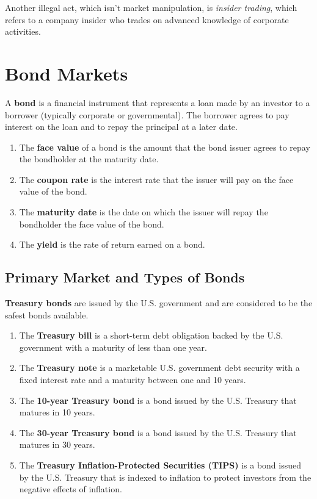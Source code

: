 \documentclass{article}
\begin{document}
    Another illegal act, which isn't market manipulation, is \textit{insider trading}, which refers to a company insider who trades on advanced knowledge of corporate activities. 

\section{Bond Markets}

    \begin{definition}[Bond]
      A \textbf{bond} is a financial instrument that represents a loan made by an investor to a borrower (typically corporate or governmental). The borrower agrees to pay interest on the loan and to repay the principal at a later date. 
      \begin{enumerate}
        \item The \textbf{face value} of a bond is the amount that the bond issuer agrees to repay the bondholder at the maturity date. 
        \item The \textbf{coupon rate} is the interest rate that the issuer will pay on the face value of the bond. 
        \item The \textbf{maturity date} is the date on which the issuer will repay the bondholder the face value of the bond. 
        \item The \textbf{yield} is the rate of return earned on a bond. 
      \end{enumerate}
    \end{definition}

  \subsection{Primary Market and Types of Bonds} 

    \begin{definition}
      \textbf{Treasury bonds} are issued by the U.S. government and are considered to be the safest bonds available. 
      \begin{enumerate}
        \item The \textbf{Treasury bill} is a short-term debt obligation backed by the U.S. government with a maturity of less than one year. 
        \item The \textbf{Treasury note} is a marketable U.S. government debt security with a fixed interest rate and a maturity between one and 10 years.
        \item The \textbf{10-year Treasury bond} is a bond issued by the U.S. Treasury that matures in 10 years. 
        \item The \textbf{30-year Treasury bond} is a bond issued by the U.S. Treasury that matures in 30 years. 
        \item The \textbf{Treasury Inflation-Protected Securities (TIPS)} is a bond issued by the U.S. Treasury that is indexed to inflation to protect investors from the negative effects of inflation. 
      \end{enumerate}
    \end{definition}
\end{document}
